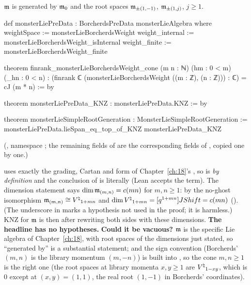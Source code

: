 \begin{theorem}\label{ch20:thm:generation}
$\mathfrak m$ is generated by $\mathfrak m_0$ and the root spaces $\mathfrak m_{\pm(1,-1)}$, $\mathfrak m_{\pm(1,j)}$, $j\ge1$.
\end{theorem}
\begin{leancode}
def monsterLiePreData : BorcherdsPreData monsterLieAlgebra where
  weightSpace := monsterLieBorcherdsWeight
  weight_internal := monsterLieBorcherdsWeight_isInternal
  weight_finite := monsterLieBorcherdsWeight_finite

theorem finrank_monsterLieBorcherdsWeight_cone (m n : ℕ) (hm : 0 < m) (_hn : 0 < n) :
    (finrank ℂ (monsterLieBorcherdsWeight ((m : ℤ), (n : ℤ))) : ℂ) = cJ (m * n) := by

theorem monsterLiePreData_KNZ : monsterLiePreData.KNZ := by

theorem monsterLieSimpleRootGeneration : MonsterLieSimpleRootGeneration :=
  monsterLiePreData.lieSpan_eq_top_of_KNZ monsterLiePreData_KNZ
\end{leancode}
(, namespace ; the remaining
fields of  are the corresponding fields of , copied one by one.)
\begin{dictionary}
 uses exactly the grading, Cartan and form of Chapter~\ref{ch:18}'s , so
 is  \emph{by definition} and the conclusion of
 is literally  (Lean accepts the term).  The dimension
statement says $\dim\mathfrak m_{(m,n)}=c(mn)$ for $m,n\ge1$: by the no-ghost isomorphism
$\mathfrak m_{(m,n)}\cong{V^{\natural}}_{1+mn}$ and $\dim{V^{\natural}}_{1+mn}=[q^{1+mn}]JShift=c(mn)$ ().
(The underscore in  marks a hypothesis not used in the proof; it is harmless.)  KNZ for $\mathfrak m$ is then
 after rewriting both sides with these dimensions.  \textbf{The headline has no hypotheses.}
\textbf{Could it be vacuous?}  $\mathfrak m$ is the specific Lie algebra of Chapter~\ref{ch:18}, with root spaces of the
dimensions just stated, so ``generated by'' is a substantial statement; and the sign convention (Borcherds' $(m,n)$ is the
library momentum $(m,-n)$) is built into , so the cone $m,n\ge1$ is the right one (the root
spaces at library momenta $x,y\ge1$ are ${V^{\natural}}_{1-xy}$, which is $0$ except at $(x,y)=(1,1)$, the real root $(1,-1)$ in
Borcherds' coordinates).
\end{dictionary}
